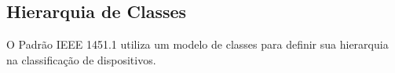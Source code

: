 \subsection{Hierarquia de Classes}
O Padrão IEEE 1451.1 utiliza um modelo de classes para definir sua hierarquia na classificação de dispositivos. 